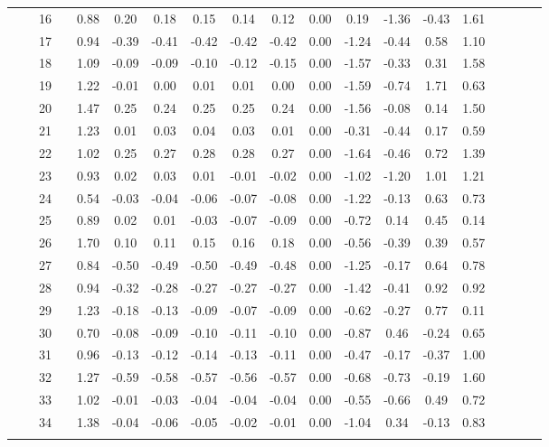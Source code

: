 \documentclass[a4paper，11pt，oneside，openany]{jsbook}
\newcommand{\bhline}[1]{\noalign{\hrule height #1}}
\begin{document}
\begin{table}[h!]
\begin{center}
\begin{tabular}{ccccccccccccccccccc}
 &  & 16 &  & 0.88 & 0.20  & 0.18  & 0.15  & 0.14  & 0.12  & 0.00 & 0.19  & -1.36 & -0.43 & 1.61 \\
 &  & 17 &  & 0.94 & -0.39 & -0.41 & -0.42 & -0.42 & -0.42 & 0.00 & -1.24 & -0.44 & 0.58  & 1.10 \\
 &  & 18 &  & 1.09 & -0.09 & -0.09 & -0.10 & -0.12 & -0.15 & 0.00 & -1.57 & -0.33 & 0.31  & 1.58 \\
 &  & 19 &  & 1.22 & -0.01 & 0.00  & 0.01  & 0.01  & 0.00  & 0.00 & -1.59 & -0.74 & 1.71  & 0.63 \\
 &  & 20 &  & 1.47 & 0.25  & 0.24  & 0.25  & 0.25  & 0.24  & 0.00 & -1.56 & -0.08 & 0.14  & 1.50 \\
 &  & 21 &  & 1.23 & 0.01  & 0.03  & 0.04  & 0.03  & 0.01  & 0.00 & -0.31 & -0.44 & 0.17  & 0.59 \\
 &  & 22 &  & 1.02 & 0.25  & 0.27  & 0.28  & 0.28  & 0.27  & 0.00 & -1.64 & -0.46 & 0.72  & 1.39 \\
 &  & 23 &  & 0.93 & 0.02  & 0.03  & 0.01  & -0.01 & -0.02 & 0.00 & -1.02 & -1.20 & 1.01  & 1.21 \\
 &  & 24 &  & 0.54 & -0.03 & -0.04 & -0.06 & -0.07 & -0.08 & 0.00 & -1.22 & -0.13 & 0.63  & 0.73 \\
 &  & 25 &  & 0.89 & 0.02  & 0.01  & -0.03 & -0.07 & -0.09 & 0.00 & -0.72 & 0.14  & 0.45  & 0.14 \\
 &  & 26 &  & 1.70 & 0.10  & 0.11  & 0.15  & 0.16  & 0.18  & 0.00 & -0.56 & -0.39 & 0.39  & 0.57 \\
 &  & 27 &  & 0.84 & -0.50 & -0.49 & -0.50 & -0.49 & -0.48 & 0.00 & -1.25 & -0.17 & 0.64  & 0.78 \\
 &  & 28 &  & 0.94 & -0.32 & -0.28 & -0.27 & -0.27 & -0.27 & 0.00 & -1.42 & -0.41 & 0.92  & 0.92 \\
 &  & 29 &  & 1.23 & -0.18 & -0.13 & -0.09 & -0.07 & -0.09 & 0.00 & -0.62 & -0.27 & 0.77  & 0.11 \\
 &  & 30 &  & 0.70 & -0.08 & -0.09 & -0.10 & -0.11 & -0.10 & 0.00 & -0.87 & 0.46  & -0.24 & 0.65 \\
 &  & 31 &  & 0.96 & -0.13 & -0.12 & -0.14 & -0.13 & -0.11 & 0.00 & -0.47 & -0.17 & -0.37 & 1.00 \\
 &  & 32 &  & 1.27 & -0.59 & -0.58 & -0.57 & -0.56 & -0.57 & 0.00 & -0.68 & -0.73 & -0.19 & 1.60 \\
 &  & 33 &  & 1.02 & -0.01 & -0.03 & -0.04 & -0.04 & -0.04 & 0.00 & -0.55 & -0.66 & 0.49  & 0.72 \\
 &  & 34 &  & 1.38 & -0.04 & -0.06 & -0.05 & -0.02 & -0.01 & 0.00 & -1.04 & 0.34  & -0.13 & 0.83 \\
\bhline{1pt}
\end{tabular}
\label{t5param}
\end{center}
\end{table}
\end{document}
